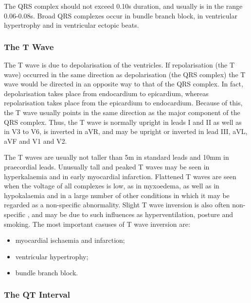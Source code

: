 The QRS complex should not exceed 0.10s duration, and usually is in the range
0.06-0.08s. Broad QRS complexes occur in bundle branch block, in ventricular
hypertrophy and in ventricular ectopic beats.

\subsubsection{The T Wave}

The T wave is due to depolarisation of the ventricles.  If repolarisation (the
T wave) occurred in the
same direction as depolarisation (the QRS complex) the T wave would be
directed in an opposite way to that of the QRS
complex. In fact, depolarisation takes place from endocardium to epicardium,
whereas repolarisation takes place from the epicardium to endocardium. Because
of this, the T wave usually points in the same direction as the major
component of the QRS complex. Thus, the T wave is normally upright in leads
I and II as well as in V3 to V6, is inverted in aVR, and may be
upright or inverted in lead III, aVL, aVF and V1 and V2.

The T waves are usually not taller than 5m in standard leads and 10mm in
praecordial leads. Unusually tall and peaked T waves may be seen in
hyperkalaemia and in early myocardial infarction. Flattened T waves are seen
when the voltage of all complexes is low, as in myxoedema, as well as in
hypokalaemia and in a large number of other conditions in which it may be
regarded as a non-specific abnormality. Slight T wave inversion is also often
non-specific , and may be due to such influences as hyperventilation, posture
and smoking. The most important casuses of T wave inversion are:
\begin{itemize}
\item myocardial ischaemia and infarction;
\item ventricular hypertrophy;
\item bundle branch block.
\end{itemize}

\subsubsection{The QT Interval}


